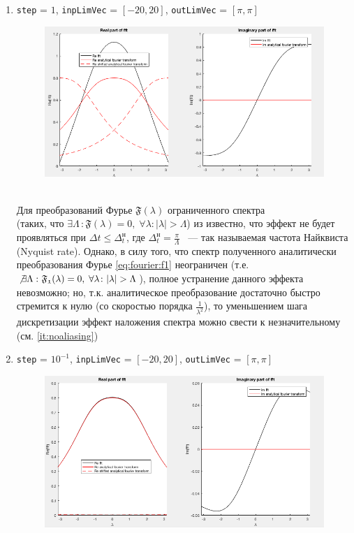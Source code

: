 \documentclass[11pt, oneside, final]{article}
\numberwithin{equation}{section}
\newcounter{icount}
\newcommand \four[1][\lambda]{\mathfrak{F}(#1)}
\begin{document}
    \begin{enumerate}
        \setcounter{enumi}{\value{icount}}
        \item 
        \texttt{step} = \(1\), \texttt{inpLimVec} = \( [-20, 20] \), \texttt{outLimVec} = \( [\pi, \pi] \)
        \begin{figure}[!h]
            \centering
            \includegraphics[width=\linewidth]{f1fig4}
            \label{pic:f1:4}
        \end{figure} \\
        Для преобразований Фурье \( \four \) ограниченного спектра \\ (таких, что \( \exists\Lambda \, \colon \four =0, \; \forall \lambda \colon |\lambda| > \Lambda \))
        из \cite{Roublev:fourier} известно, что эффект не будет проявляться при \(\Delta t \leqslant \Delta_{t}^\text{н}\),
        где \(\Delta_{t}^\text{н} = \frac{\pi}{\Lambda}\) ~--- так называемая частота Найквиста (Nyquist rate).
        Однако, в силу того, что спектр полученного аналитически преобразования Фурье \eqref{eq:fourier:f1} 
        неограничен (т.е. \(\not\exists\Lambda \, \colon \mathfrak{F_1}(\lambda) = 0, \; \forall \lambda \colon |\lambda| > \Lambda\)),
        полное устранение данного эффекта невозможно;
        но, т.к. аналитическое преобразование достаточно быстро стремится к нулю (со скоростью порядка \(\frac{1}{\lambda^2}\)), 
        то уменьшением шага дискретизации эффект наложения спектра можно свести к незначительному (см. \ref{it:noaliasing})
        \clearpage
        \item
        \label{it:noaliasing}
        \texttt{step} = \(10^{-1}\), \texttt{inpLimVec} = \( [-20, 20] \), \texttt{outLimVec} = \( [\pi, \pi] \)
        \begin{figure}[!h]
            \centering
            \includegraphics[width=\linewidth]{f1fig5}

\end{figure}
\end{enumerate}
\end{document}
